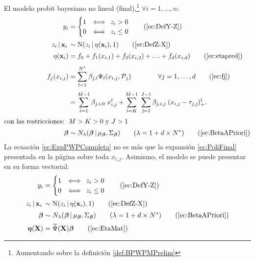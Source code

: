 \documentclass[../Main/Main.tex]{subfiles}
\begin{document}
\begin{definition} \label{def:BPWPMFinal}
El modelo probit bayesiano no lineal (final),\footnote{Aumentando sobre la definición \ref{def:BPWPMPrelim}} $\forall i = 1,\ldots,n$: 
\begin{align}
y_i &= 
	\begin{cases}
		1 & \Longleftrightarrow \enspace z_i > 0 \\
		0 & \Longleftrightarrow \enspace z_i \leq 0
	\end{cases} \tag{\ref{ec:DefY-Z}} \\[2pt]
z_i \,|\, \xni\, &\sim \text{N}(z_i\,|\,\eta(\xni),1) 
	\tag{\ref{ec:DefZ-X}} \\[2pt]
\eta(\xni) &= f_0 + f_1(x_{i,1}) + f_2(x_{i,2}) + \ldots + f_d(x_{i,d})
	\tag{\ref{ec:etapred}} \\[4pt]
f_j(x_{i,j}) &= \sum_{l = 1}^{\N} \beta_{j,l} \Psi_l(x_{i,j}, \mathcal{P}_j) 
	\qquad\qquad
	\forall j = 1,\ldots,d \tag{\ref{ec:fj}} \\[3pt]
&=	\sum_{\hat{\imath} = 1}^{M - 1} \beta_{j,\hat{\imath},0} \; 
		x_{i,j}^{\hat{\imath}} + 
	\sum_{\hat{\imath} = K}^{M-1} \; 	
	\sum_{\hat{\jmath} = 1}^{J-1}\beta_{j,\hat{\imath},\hat{\jmath}}
		\;(x_{i,j} - \t_{j,\hat{\jmath}})_{+}^{\hat{\imath}}. \label{ec:ExpPWPCompleta}\\[2pt]
	\text{con las restricciones: } \, & M > K > 0 \text{ y } J > 1 \nonumber \\[2pt]
	\bm{\beta} &\sim N_{\lambda}(\bm{\beta}\,|\,\mu_{\bm{\beta}}, \Sigma_{\bm{\beta}}) \qquad(\lambda = 1 + d\times\N) \tag{\ref{ec:BetaAPriori}} 
\end{align}
La ecuación \eqref{ec:ExpPWPCompleta} no es más que la expansión \ref{ec:PoliFinal} presentada en la página \pageref{ec:PoliFinal} sobre toda $x_{i,j}$. Asimismo, el modelo se puede presentar en su forma vectorial:
\begin{align}
y_i &= 
	\begin{cases}
		1 & \Longleftrightarrow \enspace z_i > 0 \\
		0 & \Longleftrightarrow \enspace z_i \leq 0
	\end{cases} \tag{\ref{ec:DefY-Z}} \\[2pt]
z_i \,|\, \xni\, &\sim \text{N}(z_i\,|\,\eta(\xni),1) 
	\tag{\ref{ec:DefZ-X}} \\[2pt]
		\bm{\beta} &\sim N_{\lambda}(\bm{\beta}\,|\,\mu_{\bm{\beta}}, \Sigma_{\bm{\beta}}) \qquad(\lambda = 1 + d\times\N) \tag{\ref{ec:BetaAPriori}} \\[2pt]
\bm{\eta}(\xmat) &= \widetilde{\Psi}(\xmat)\bm{\beta} \tag{\ref{ec:EtaMat}}
\end{align}
\end{definition}
\end{document}

